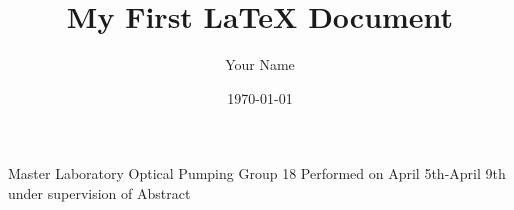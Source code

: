 \documentclass[11pt]{article}
\title{My First LaTeX Document}
\author{Your Name}
\date{\today}
\begin{document}
Master Laboratory
Optical Pumping
Group 18
Performed on April 5th-April 9th
under supervision of
Abstract
\end{document}
